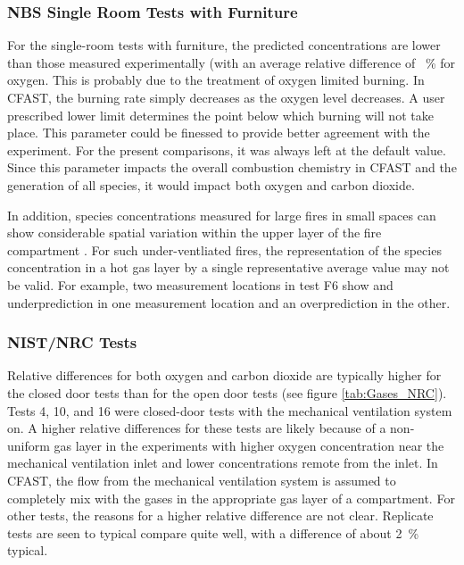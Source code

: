 \subsubsection{NBS Single Room Tests with Furniture}

For the single-room tests with furniture, the predicted concentrations are lower than those 
measured experimentally (with an average relative difference of \furnoxygenavg~\% for oxygen.  This is probably due to the treatment of oxygen limited burning.  In CFAST, the burning rate simply decreases as the oxygen level decreases.  A user prescribed lower limit determines the point below which burning will not take place.  This parameter could be finessed to provide better agreement with the experiment.  For the present comparisons, it was always left at the default value. Since this parameter impacts the overall combustion chemistry in CFAST and the generation of all species, it would impact both oxygen and carbon dioxide.

In addition, species concentrations measured for large fires in small spaces can show considerable spatial variation within the upper layer of the fire compartment \cite{Bundy:2007}. For such under-ventliated fires, the representation of the species concentration in a hot gas layer by a single representative average value may not be valid. For example, two measurement locations in test F6 show and underprediction in one measurement location and an overprediction in the other.

\subsubsection{NIST/NRC Tests}

Relative differences for both oxygen and carbon dioxide are typically higher for the closed door tests than for the open door tests (see figure \ref{tab:Gases_NRC}).  Tests 4, 10, and 16 were closed-door tests with the mechanical ventilation system on.  A higher relative differences for these tests are likely because of a non-uniform gas layer in the experiments with higher oxygen concentration near the mechanical ventilation inlet and lower concentrations remote from the inlet.  In CFAST, the flow from the mechanical ventilation system is assumed to completely mix with the gases in the appropriate gas layer of a compartment.  For other tests, the reasons for a higher relative difference are not clear.  Replicate tests are seen to typical compare quite well, with a difference of about 2~\% typical.

